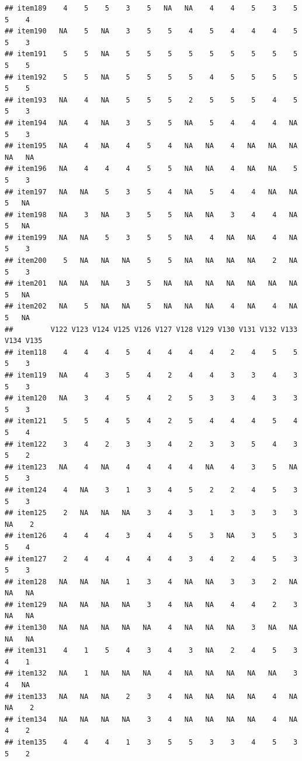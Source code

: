 \documentclass[
  man]{apa6}
\begin{document}
\begin{verbatim}
## item189    4    5    5    3    5   NA   NA    4    4    5    3    5    5    4
## item190   NA    5   NA    3    5    5    4    5    4    4    4    5    5    3
## item191    5    5   NA    5    5    5    5    5    5    5    5    5    5    5
## item192    5    5   NA    5    5    5    5    4    5    5    5    5    5    5
## item193   NA    4   NA    5    5    5    2    5    5    5    4    5    5    3
## item194   NA    4   NA    3    5    5   NA    5    4    4    4   NA    5    3
## item195   NA    4   NA    4    5    4   NA   NA    4   NA   NA   NA   NA   NA
## item196   NA    4    4    4    5    5   NA   NA    4   NA   NA    5    5    3
## item197   NA   NA    5    3    5    4   NA    5    4    4   NA   NA    5   NA
## item198   NA    3   NA    3    5    5   NA   NA    3    4    4   NA    5   NA
## item199   NA   NA    5    3    5    5   NA    4   NA   NA    4   NA    5    3
## item200    5   NA   NA   NA    5    5   NA   NA   NA   NA    2   NA    5    3
## item201   NA   NA   NA    3    5   NA   NA   NA   NA   NA   NA   NA    5   NA
## item202   NA    5   NA   NA    5   NA   NA   NA    4   NA    4   NA    5   NA
##         V122 V123 V124 V125 V126 V127 V128 V129 V130 V131 V132 V133 V134 V135
## item118    4    4    4    5    4    4    4    4    2    4    5    5    5    3
## item119   NA    4    3    5    4    2    4    4    3    3    4    3    5    3
## item120   NA    3    4    5    4    2    5    3    3    4    3    3    5    3
## item121    5    5    4    5    4    2    5    4    4    4    5    4    5    4
## item122    3    4    2    3    3    4    2    3    3    5    4    3    5    2
## item123   NA    4   NA    4    4    4    4   NA    4    3    5   NA    5    3
## item124    4   NA    3    1    3    4    5    2    2    4    5    3    5    3
## item125    2   NA   NA   NA    3    4    3    1    3    3    3    3   NA    2
## item126    4    4    4    3    4    4    5    3   NA    3    5    3    5    4
## item127    2    4    4    4    4    4    3    4    2    4    5    3    5    3
## item128   NA   NA   NA    1    3    4   NA   NA    3    3    2   NA   NA   NA
## item129   NA   NA   NA   NA    3    4   NA   NA    4    4    2    3   NA   NA
## item130   NA   NA   NA   NA   NA    4   NA   NA   NA    3   NA   NA   NA   NA
## item131    4    1    5    4    3    4    3   NA    2    4    5    3    4    1
## item132   NA    1   NA   NA   NA    4   NA   NA   NA   NA   NA    3    4   NA
## item133   NA   NA   NA    2    3    4   NA   NA   NA   NA    4   NA   NA    2
## item134   NA   NA   NA   NA    3    4   NA   NA   NA   NA    4   NA    4    2
## item135    4    4    4    1    3    5    5    3    3    4    5    3    5    2

\end{verbatim}
\end{document}
